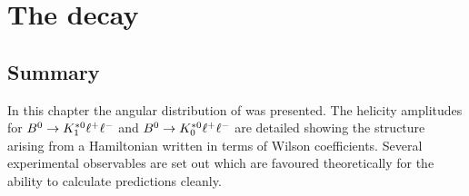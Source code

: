 \chapter{The \BdToKstll decay	}
\label{chap:kstmm:theo}







\section{Summary}

In this chapter the angular distribution of \BdToKstll was presented.
The helicity amplitudes for $B^0\rightarrow K^{*0}_{1}\ell^+ \ell^-$ and $B^0\rightarrow K^{*0}_{0}\ell^+ \ell^-$ are detailed 
 showing the structure arising from a Hamiltonian written in terms of Wilson coefficients.
Several experimental observables are set out which are favoured theoretically for
 the ability to calculate predictions cleanly.

 
